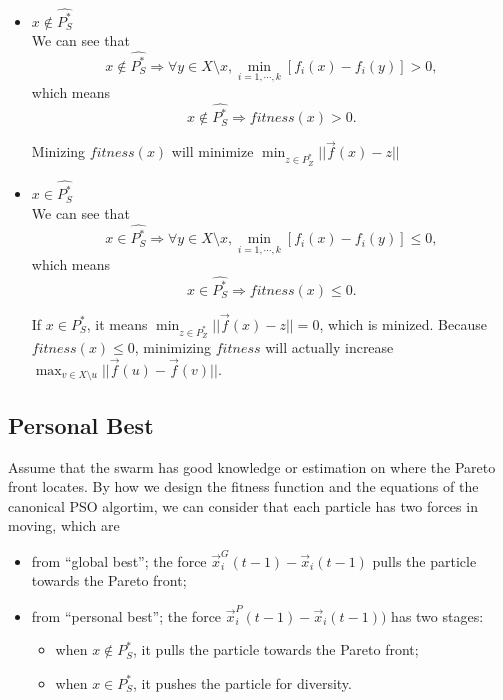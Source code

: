 \documentclass[12pt]{article}
\begin{document}
\begin{itemize}

\item $ x \notin \hat{P^{*}_{S}} $ \\
We can see that
\begin{equation}
x \notin \hat{P^{*}_{S}} \Rightarrow  \forall y \in X \setminus x, \min_{i=1, \cdots , k} [ f_{i}(x) - f_{i}(y) ] > 0,
\end{equation}
which means
\begin{equation}
x \notin \hat{P^{*}_{S}} \Rightarrow fitness(x) > 0.
\end{equation}

Minizing $ fitness(x) $ will minimize $  \min_{z \in P^{*}_{Z} } || \vec{f}(x) - z  ||  $

\item $ x \in \hat{P^{*}_{S}} $ \\
We can see that
\begin{equation}
x \in \hat{P^{*}_{S}} \Rightarrow \forall y \in X \setminus x, \min_{i=1, \cdots , k} [ f_{i}(x) - f_{i}(y) ] \leq 0,
\end{equation}
which means
\begin{equation}
x \in \hat{P^{*}_{S}} \Rightarrow fitness(x) \leq 0.
\end{equation}

If $ x \in P^{*}_{S} $, it means $  \min_{z \in P^{*}_{Z} } || \vec{f}(x) - z  ||  = 0 $, which is minized.
Because $ fitness(x) \leq 0 $, minimizing $ fitness $ will actually increase $ \max_{v \in X \setminus u} || \vec{f}(u) - \vec{f}(v) ||  $.

\end{itemize}

\subsection{Personal Best}

Assume that the swarm has good knowledge or estimation on where the Pareto front locates.
By how we design the fitness function and the equations of the canonical PSO algortim, we can consider that each particle has two forces in moving, which are
\begin{itemize}
\item from ``global best'';
the force $ \vec{x}^{G}_{i}(t-1) - \vec{x}_{i}(t-1) $ pulls the particle towards the Pareto front;

\item from ``personal best'';
the force $ \vec{x}^{P}_{i}(t-1) - \vec{x}_{i}(t-1)) $ has two stages:
\begin{itemize}
\item when $ x \notin P^{*}_{S} $, it pulls the particle towards the Pareto front;
\item when  $ x \in P^{*}_{S} $, it pushes the particle for diversity.
\end{itemize}

\end{itemize}
\end{document}
